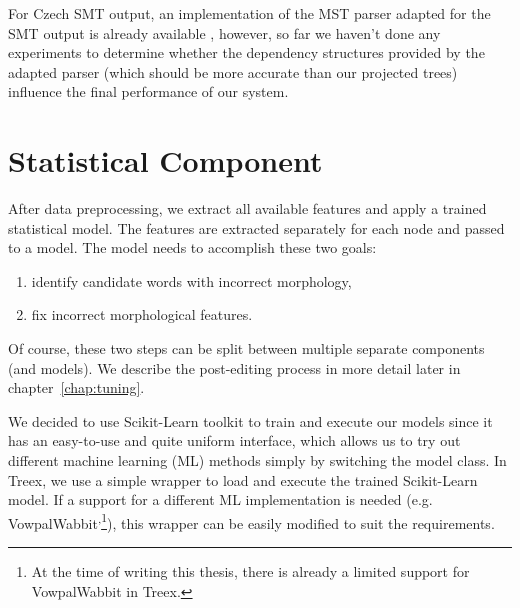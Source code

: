 For Czech SMT output, an implementation of the MST parser adapted for the SMT output
is already available \citep{biblio:RoDuUsingParallel2012}, however, so far we haven't done any experiments
to determine whether the dependency structures provided by the adapted parser (which
should be more accurate than our projected trees) influence the final performance of our system.



\section{Statistical Component}

After data preprocessing, we extract all available features and
apply a trained statistical model. The features are extracted separately for each node and passed
to a model. The model needs to accomplish these two goals:
\begin{enumerate}
    \item identify candidate words with incorrect morphology,
    \item fix incorrect morphological features.
\end{enumerate}
Of course, these two steps can be split between multiple separate components (and models).
We describe the post-editing process in more detail later in chapter~\ref{chap:tuning}.

We decided to use Scikit-Learn \citep{scikit-learn} toolkit to train and execute our models since
it has an easy-to-use and quite uniform interface, which allows us to try out different
machine learning (ML) methods simply by switching the model class. In Treex, we use a simple
wrapper to load and execute the trained Scikit-Learn model. If a support for a different ML implementation
is needed (e.g. VowpalWabbit\textsuperscript{,}\footnote{At the time of writing this thesis, there is already
a limited support for VowpalWabbit in Treex.}), this wrapper can be easily modified to suit the requirements.

